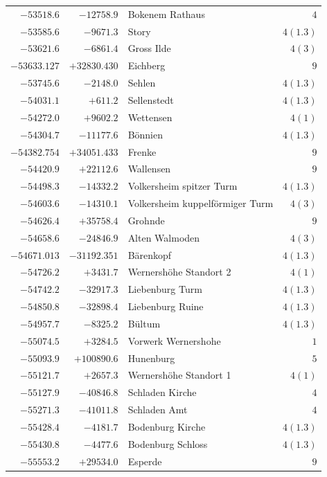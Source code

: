 \begin{center}
\begin{tabular}{r|r|p{170pt}|r}
\(-53518.6\)&\(-12758.9\)&Bokenem Rathaus&\(4\)\\
\(-53585.6\)&\(-9671.3\)&Story&\(4(1.3)\)\\
\(-53621.6\)&\(-6861.4\)&Gross Ilde&\(4 (3)\)\\
\(-53633.127\)&\(+32830.430\)&Eichberg&\(9\)\\
\(-53745.6\)&\(-2148.0\)&Sehlen&\(4(1.3)\)\\
\(-54031.1\)&\(+611.2\)&Sellenstedt&\(4(1.3)\)\\
\(-54272.0\)&\(+9602.2\)&Wettensen&\(4 (1)\)\\
\(-54304.7\)&\(-11177.6\)&Bönnien&\(4(1.3)\)\\
\(-54382.754\)&\(+34051.433\)&Frenke&\(9\)\\
\(-54420.9\)&\(+22112.6\)&Wallensen&\(9\)\\
\(-54498.3\)&\(-14332.2\)&Volkersheim spitzer Turm&\(4(1.3)\)\\
\(-54603.6\)&\(-14310.1\)&Volkersheim kuppelförmiger Turm&\(4 (3)\)\\
\(-54626.4\)&\(+35758.4\)&Grohnde&\(9\)\\
\(-54658.6\)&\(-24846.9\)&Alten Walmoden&\(4(3)\)\\
\(-54671.013\)&\(-31192.351\)&Bärenkopf&\(4(1.3)\)\\
\(-54726.2\)&\(+3431.7\)&Wernershöhe Standort 2&\(4 (1)\)\\
\(-54742.2\)&\(-32917.3\)&Liebenburg Turm&\(4(1.3)\)\\
\(-54850.8\)&\(-32898.4\)&Liebenburg Ruine&\(4(1.3)\)\\
\(-54957.7\)&\(-8325.2\)&Bültum&\(4(1.3)\)\\
\(-55074.5\)&\(+3284.5\)&Vorwerk Wernershohe&\(1\)\\
\(-55093.9\)&\(+100890.6\)&Hunenburg&\(5\)\\
\(-55121.7\)&\(+2657.3\)&Wernershöhe Standort 1&\(4(1)\)\\
\(-55127.9\)&\(-40846.8\)&Schladen Kirche&\(4\)\\
\(-55271.3\)&\(-41011.8\)&Schladen Amt&\(4\)\\
\(-55428.4\)&\(-4181.7\)&Bodenburg Kirche&\(4(1.3)\)\\
\(-55430.8\)&\(-4477.6\)&Bodenburg Schloss&\(4(1.3)\)\\
\(-55553.2\)&\(+29534.0\)&Esperde&\(9\)\\
\hline\end{tabular}\endgroup\end{center}
